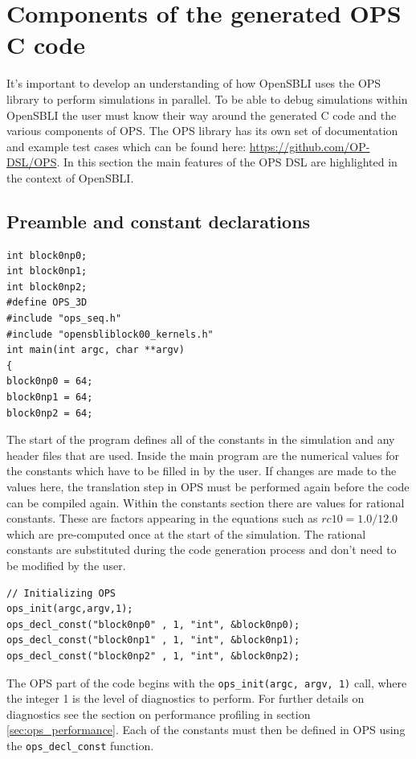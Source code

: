 \documentclass[11pt]{article}
\begin{document}
\newpage
\section{Components of the generated OPS C code}
It's important to develop an understanding of how OpenSBLI uses the OPS library to perform simulations in parallel. To be able to debug simulations within OpenSBLI the user must know their way around the generated C code and the various components of OPS. The OPS library has its own set of documentation and example test cases which can be found here: \url{https://github.com/OP-DSL/OPS}. In this section the main features of the OPS DSL are highlighted in the context of OpenSBLI.

\subsection{Preamble and constant declarations}
\begin{lstlisting}
int block0np0;
int block0np1;
int block0np2;
#define OPS_3D
#include "ops_seq.h"
#include "opensbliblock00_kernels.h"
int main(int argc, char **argv) 
{
block0np0 = 64;
block0np1 = 64;
block0np2 = 64;
\end{lstlisting}
The start of the program defines all of the constants in the simulation and any header files that are used. Inside the main program are the numerical values for the constants which have to be filled in by the user. If changes are made to the values here, the translation step in OPS must be performed again before the code can be compiled again. Within the constants section there are values for rational constants. These are factors appearing in the equations such as $rc10 = 1.0/12.0$ which are pre-computed once at the start of the simulation. The rational constants are substituted during the code generation process and don't need to be modified by the user.

\begin{lstlisting}
// Initializing OPS 
ops_init(argc,argv,1);
ops_decl_const("block0np0" , 1, "int", &block0np0);
ops_decl_const("block0np1" , 1, "int", &block0np1);
ops_decl_const("block0np2" , 1, "int", &block0np2);
\end{lstlisting}
The OPS part of the code begins with the \verb|ops_init(argc, argv, 1)| call, where the integer 1 is the level of diagnostics to perform. For further details on diagnostics see the section on performance profiling in section \ref{sec:ops_performance}. Each of the constants must then be defined in OPS using the \verb|ops_decl_const| function.
\end{document}
